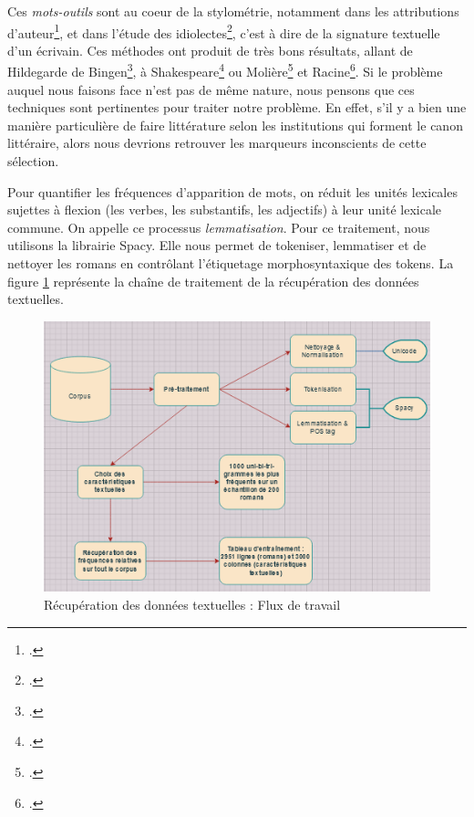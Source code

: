Ces \textit{mots-outils} sont au coeur de la stylométrie, notamment dans les attributions d'auteur\footcites{burrows_delta_2002}, et dans l'étude des idiolectes\footcites{seminck_evolution_2022}, c'est à dire de la signature textuelle d'un écrivain. Ces méthodes ont produit de très bons résultats, allant de Hildegarde de Bingen\footcites{kestemont_function_2014}, à Shakespeare\footcites{plechac_relative_2021} ou Molière\footcites{cafiero_why_2019} et Racine\footcites{cafiero2021psyche}. Si le problème auquel nous faisons face n'est pas de même nature, nous pensons que ces techniques sont pertinentes pour traiter notre problème. En effet, s'il y a bien une manière particulière de faire littérature selon les institutions qui forment le canon littéraire, alors nous devrions retrouver les marqueurs inconscients de cette sélection. 

Pour quantifier les fréquences d'apparition de mots, on réduit les unités lexicales sujettes à flexion (les verbes, les substantifs, les adjectifs) à leur unité lexicale commune. On appelle ce processus \textit{lemmatisation}. Pour ce traitement, nous utilisons la librairie Spacy. Elle nous permet de tokeniser, lemmatiser et de nettoyer les romans en contrôlant l'étiquetage morphosyntaxique des tokens. La figure \ref{work_flow} représente la chaîne de traitement de la récupération des données textuelles.

\bigskip
\begin{figure}[!ht]
    \centering
    \includegraphics[width=15cm]{img/05_work_flow.png}
    \caption{Récupération des données textuelles : Flux de travail}
    \label{work_flow}
\end{figure}

